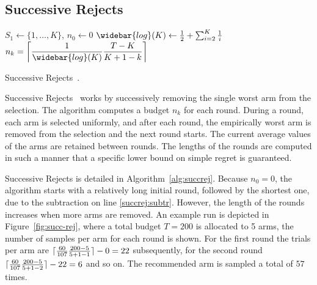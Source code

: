 \documentclass{kecsmstr}
\DeclarePairedDelimiter{\ceil}{\lceil}{\rceil}
\begin{document}
\subsection{Successive Rejects}
\IncMargin{1em}
\begin{algorithm2e}[ht]
	\Indm
	\vspace{0.2cm}
	\Indp
	$S_1 \gets \{1,\dots,K\}$, $n_0 \gets 0$										\; 
	$\widebar{log}(K) \gets \frac{1}{2} + \sum_{i=2}^{K} \frac{1}{i}$				\;
	\BlankLine
	 {
		$n_k = \displaystyle\ceil[\bigg]{\frac{1}{\widebar{log}(K)} \frac{T-K}{K+1-k}}$				\;
	}
	\BlankLine
	\BlankLine
  \caption[Successive Rejects]{Successive Rejects~\protect{}. \label{alg:succrej}}
\end{algorithm2e}
\DecMargin{1em}

Successive Rejects~ works by successively removing the single worst arm from the selection. The algorithm computes a budget $n_k$ for each round. During a round, each arm is selected uniformly, and after each round, the empirically worst arm is removed from the selection and the next round starts. The current average values of the arms are retained between rounds. The lengths of the rounds are computed in such a manner that a specific lower bound on simple regret is guaranteed.

Successive Rejects is detailed in Algorithm~\ref{alg:succrej}. Because $n_0 = 0$, the algorithm starts with a relatively long initial round, followed by the shortest one, due to the subtraction on line \ref{succrej:subtr}. However, the length of the rounds increases when more arms are removed. An example run is depicted in Figure~\ref{fig:succ-rej}, where a total budget $T = 200$ is allocated to 5 arms, the number of samples per arm for each round is shown. For the first round the trials per arm are $\ceil{\frac{60}{107} \frac{200-5}{5+1-1}} - 0 = 22$ subsequently, for the second round $\ceil{\frac{60}{107} \frac{200-5}{5+1-2}} - 22 = 6$ and so on. The recommended arm is sampled a total of $57$ times.
\end{document}
